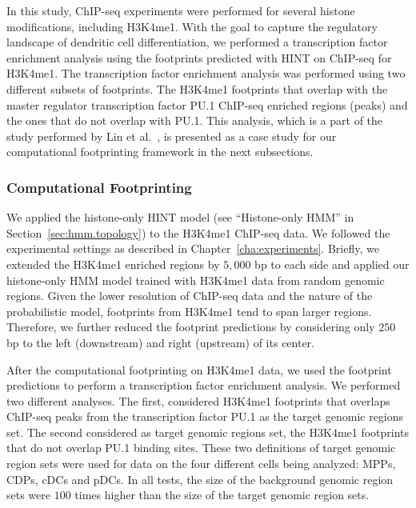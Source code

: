 In this study, ChIP-seq experiments were performed for several histone modifications, including H3K4me1. With the goal to capture the regulatory landscape of dendritic cell differentiation, we performed a transcription factor enrichment analysis using the footprints predicted with HINT on ChIP-seq for H3K4me1. The transcription factor enrichment analysis was performed using two different subsets of footprints. The H3K4me1 footprints that overlap with the master regulator transcription factor PU.1 ChIP-seq enriched regions (peaks) and the ones that do not overlap with PU.1. This analysis, which is a part of the study performed by Lin et al.~\cite{lin2015}, is presented as a case study for our computational footprinting framework in the next subsections.

\subsubsection{Computational Footprinting}
\label{sec:cs1.computational.footprinting}

We applied the histone-only HINT model (see ``Histone-only HMM'' in Section~\ref{sec:hmm.topology}) to the H3K4me1 ChIP-seq data. We followed the experimental settings as described in Chapter~\ref{cha:experiments}. Briefly, we extended the H3K4me1 enriched regions by $5,000$ bp to each side and applied our histone-only HMM model trained with H3K4me1 data from random genomic regions. Given the lower resolution of ChIP-seq data and the nature of the probabilistic model, footprints from H3K4me1 tend to span larger regions. Therefore, we further reduced the footprint predictions by considering only $250$ bp to the left (downstream) and right (upstream) of its center.

After the computational footprinting on H3K4me1 data, we used the footprint predictions to perform a transcription factor enrichment analysis. We performed two different analyses. The first, considered H3K4me1 footprints that overlaps ChIP-seq peaks from the transcription factor PU.1 as the target genomic regions set. The second considered as target genomic regions set, the H3K4me1 footprints that do not overlap PU.1 binding sites. These two definitions of target genomic region sets were used for data on the four different cells being analyzed: MPPs, CDPs, cDCs and pDCs. In all tests, the size of the background genomic region sets were $100$ times higher than the size of the target genomic region sets.

